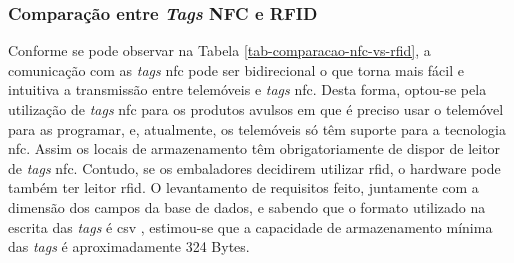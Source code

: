 \subsubsection{Comparação entre \textit{Tags} NFC e RFID}
\begin{table}[H]
	\centering
	\caption{Comparação da tecnologia \acrshort{nfc} com a tecnologia \acrshort{rfid}}\vspace{2mm}
	\label{tab-comparacao-nfc-vs-rfid}
\end{table}

Conforme se pode observar na Tabela \ref{tab-comparacao-nfc-vs-rfid}, a comunicação com as \textit{tags} \acrshort{nfc} pode ser bidirecional o que torna mais fácil e intuitiva a transmissão entre telemóveis e \textit{tags} \acrshort{nfc}. Desta forma, optou-se pela utilização de \textit{tags} \acrshort{nfc} para os produtos avulsos em que é preciso usar o telemóvel para as programar, e, atualmente, os telemóveis só têm suporte para a tecnologia \acrshort{nfc}. Assim os locais de armazenamento têm obrigatoriamente de dispor de leitor de \textit{tags} \acrshort{nfc}. Contudo, se os embaladores decidirem utilizar \acrshort{rfid}, o hardware pode também ter leitor \acrshort{rfid}. O levantamento de requisitos feito, juntamente com a dimensão dos campos da base de dados, e sabendo que o formato utilizado na escrita das \textit{tags} é \acrfull{csv} \cite{RFC4180:csv}, estimou-se que a capacidade de armazenamento mínima das \textit{tags} é aproximadamente 324 Bytes.
